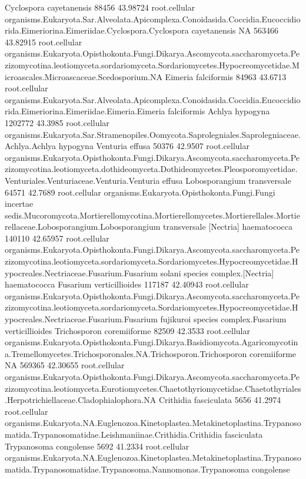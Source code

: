 \documentclass{article}
\begin{document}
\begin{Schunk}
\begin{Soutput}
 Cyclospora cayetanensis 		 88456 43.98724 	 root.cellular organisms.Eukaryota.Sar.Alveolata.Apicomplexa.Conoidasida.Coccidia.Eucoccidiorida.Eimeriorina.Eimeriidae.Cyclospora.Cyclospora cayetanensis
 NA 		 563466 43.82915 	 root.cellular organisms.Eukaryota.Opisthokonta.Fungi.Dikarya.Ascomycota.saccharomyceta.Pezizomycotina.leotiomyceta.sordariomyceta.Sordariomycetes.Hypocreomycetidae.Microascales.Microascaceae.Scedosporium.NA
 Eimeria falciformis 		 84963 43.6713 	 root.cellular organisms.Eukaryota.Sar.Alveolata.Apicomplexa.Conoidasida.Coccidia.Eucoccidiorida.Eimeriorina.Eimeriidae.Eimeria.Eimeria falciformis
 Achlya hypogyna 		 1202772 43.3985 	 root.cellular organisms.Eukaryota.Sar.Stramenopiles.Oomycota.Saprolegniales.Saprolegniaceae.Achlya.Achlya hypogyna
 Venturia effusa 		 50376 42.9507 	 root.cellular organisms.Eukaryota.Opisthokonta.Fungi.Dikarya.Ascomycota.saccharomyceta.Pezizomycotina.leotiomyceta.dothideomyceta.Dothideomycetes.Pleosporomycetidae.Venturiales.Venturiaceae.Venturia.Venturia effusa
 Lobosporangium transversale 		 64571 42.7689 	 root.cellular organisms.Eukaryota.Opisthokonta.Fungi.Fungi incertae sedis.Mucoromycota.Mortierellomycotina.Mortierellomycetes.Mortierellales.Mortierellaceae.Lobosporangium.Lobosporangium transversale
 [Nectria] haematococca 		 140110 42.65957 	 root.cellular organisms.Eukaryota.Opisthokonta.Fungi.Dikarya.Ascomycota.saccharomyceta.Pezizomycotina.leotiomyceta.sordariomyceta.Sordariomycetes.Hypocreomycetidae.Hypocreales.Nectriaceae.Fusarium.Fusarium solani species complex.[Nectria] haematococca
 Fusarium verticillioides 		 117187 42.40943 	 root.cellular organisms.Eukaryota.Opisthokonta.Fungi.Dikarya.Ascomycota.saccharomyceta.Pezizomycotina.leotiomyceta.sordariomyceta.Sordariomycetes.Hypocreomycetidae.Hypocreales.Nectriaceae.Fusarium.Fusarium fujikuroi species complex.Fusarium verticillioides
 Trichosporon coremiiforme 		 82509 42.3533 	 root.cellular organisms.Eukaryota.Opisthokonta.Fungi.Dikarya.Basidiomycota.Agaricomycotina.Tremellomycetes.Trichosporonales.NA.Trichosporon.Trichosporon coremiiforme
 NA 		 569365 42.30655 	 root.cellular organisms.Eukaryota.Opisthokonta.Fungi.Dikarya.Ascomycota.saccharomyceta.Pezizomycotina.leotiomyceta.Eurotiomycetes.Chaetothyriomycetidae.Chaetothyriales.Herpotrichiellaceae.Cladophialophora.NA
 Crithidia fasciculata 		 5656 41.2974 	 root.cellular organisms.Eukaryota.NA.Euglenozoa.Kinetoplastea.Metakinetoplastina.Trypanosomatida.Trypanosomatidae.Leishmaniinae.Crithidia.Crithidia fasciculata
 Trypanosoma congolense 		 5692 41.2334 	 root.cellular organisms.Eukaryota.NA.Euglenozoa.Kinetoplastea.Metakinetoplastina.Trypanosomatida.Trypanosomatidae.Trypanosoma.Nannomonas.Trypanosoma congolense

\end{Soutput}
\end{Schunk}
\end{document}
